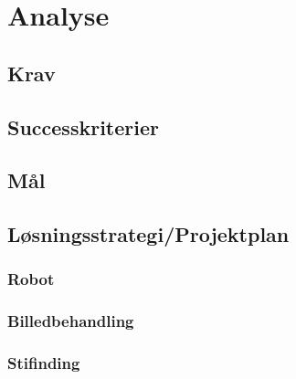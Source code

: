 \chapter{Analyse}

\section{Krav}
\section{Successkriterier}
\section{Mål}
\section{Løsningsstrategi/Projektplan}
\subsection{Robot}
\subsection{Billedbehandling}
\subsection{Stifinding}